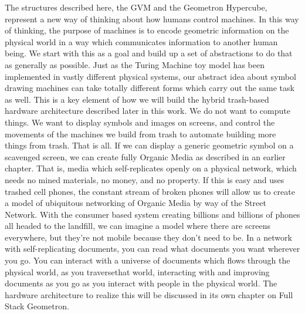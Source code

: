 The structures described here, the GVM and the Geometron Hypercube, represent a new way of thinking about how humans control machines.  In this way of thinking, the purpose of machines is to encode geometric information on the physical world in a way which communicates information to another human being.  We start with this as a goal and build up a set of abstractions to do that as generally as possible.  Just as the Turing Machine toy model has been implemented in vastly different physical systems, our abstract idea about symbol drawing machines can take totally different forms which carry out the same task as well.  This is a key element of how we will build the hybrid trash-based hardware architecture described later in this work.  We do not want to compute things. We want to display symbols and images on screens, and control the movements of the machines we build from trash to automate building more things from trash. That is all.  If we can display a generic geometric symbol on a scavenged screen, we can create fully Organic Media as described in an earlier chapter.  That is, media which self-replicates openly on a physical network, which needs no mined materials, no money, and no property.  If this is easy and uses trashed cell phones, the constant stream of broken phones will allow us to create a model of ubiquitous networking of Organic Media by way of the Street Network.  With the consumer based system creating billions and billions of phones all headed to the landfill, we can imagine a model where there are screens everywhere, but they're not mobile because they don't need to be.  In a network with self-replicating documents, you can read what documents you want wherever you go.  You can interact with a universe of documents which flows through the physical world, as you traversethat world, interacting with and improving documents as you go as you interact with people in the physical world.    The hardware architecture to realize this will be discussed in its own chapter on Full Stack Geometron.


